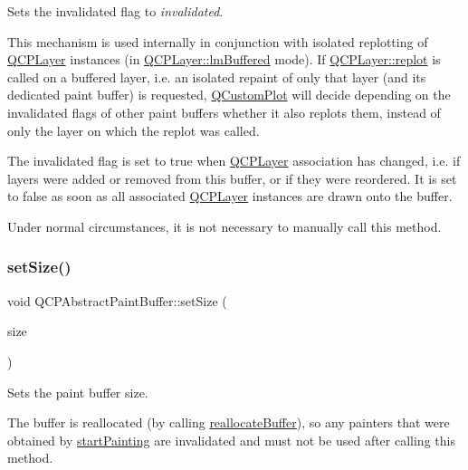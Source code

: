 Sets the invalidated flag to {\itshape invalidated}.

This mechanism is used internally in conjunction with isolated replotting of \mbox{\hyperlink{class_q_c_p_layer}{Q\+C\+P\+Layer}} instances (in \mbox{\hyperlink{class_q_c_p_layer_a67dcfc1590be2a1f2227c5a39bb59c7cab581b9fab3007c4c65f057f4185d7538}{Q\+C\+P\+Layer\+::lm\+Buffered}} mode). If \mbox{\hyperlink{class_q_c_p_layer_adefd53b6db02f470151c416f42e37180}{Q\+C\+P\+Layer\+::replot}} is called on a buffered layer, i.\+e. an isolated repaint of only that layer (and its dedicated paint buffer) is requested, \mbox{\hyperlink{class_q_custom_plot}{Q\+Custom\+Plot}} will decide depending on the invalidated flags of other paint buffers whether it also replots them, instead of only the layer on which the replot was called.

The invalidated flag is set to true when \mbox{\hyperlink{class_q_c_p_layer}{Q\+C\+P\+Layer}} association has changed, i.\+e. if layers were added or removed from this buffer, or if they were reordered. It is set to false as soon as all associated \mbox{\hyperlink{class_q_c_p_layer}{Q\+C\+P\+Layer}} instances are drawn onto the buffer.

Under normal circumstances, it is not necessary to manually call this method. \mbox{\label{class_q_c_p_abstract_paint_buffer_a8b68c3cd36533f1a4a23b5ce8cd66f01}} 
\subsubsection{\texorpdfstring{set\+Size()}{setSize()}}
{\footnotesize\ttfamily void Q\+C\+P\+Abstract\+Paint\+Buffer\+::set\+Size (\begin{DoxyParamCaption}\item[{const Q\+Size \&}]{size }\end{DoxyParamCaption})}

Sets the paint buffer size.

The buffer is reallocated (by calling \mbox{\hyperlink{class_q_c_p_abstract_paint_buffer_aee7506a52bd7e5a07c2af27935eb13e7}{reallocate\+Buffer}}), so any painters that were obtained by \mbox{\hyperlink{class_q_c_p_abstract_paint_buffer_a9e9f29b19c033cf02fb96f1a148463f3}{start\+Painting}} are invalidated and must not be used after calling this method.

